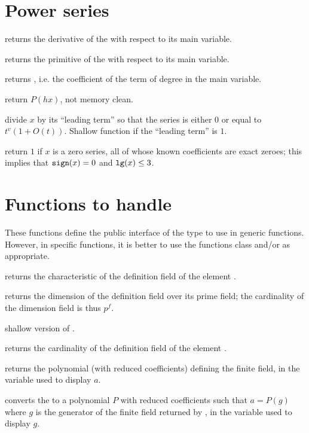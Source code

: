 \section{Power series}

 returns the derivative of the  
with respect to its main variable.

 returns the primitive of the  
with respect to its main variable.

 returns , i.e.
the coefficient of the term of degree  in the main variable.

 return $P(h x)$, not memory clean.

 divide $x$ by its ``leading term'' so that
the series is either $0$ or equal to $t^v(1+O(t))$. Shallow function if the
``leading term'' is $1$.

 return $1$ if $x$ is a zero series, all
of whose known coefficients are exact zeroes; this implies that
${\tt sign}(x) = 0$ and ${\tt lg}(x) \leq 3$.

\section{Functions to handle }
These functions define the public interface of the  type to use in
generic functions.  However, in specific functions, it is better to use the
functions class  and/or  as appropriate.

 returns the characteristic of the definition field of the
 element .

 returns the dimension of the definition field over
its prime field; the cardinality of the dimension field is thus $p^f$.

 shallow version of .

 returns the cardinality of the definition field of the
 element .

 returns the polynomial (with reduced 
coefficients) defining the finite field, in the variable used to display $a$.

 converts the   to a polynomial
$P$ with reduced  coefficients such that $a=P(g)$ where $g$ is the
generator of the finite field returned by , in the variable used to
display $g$.


